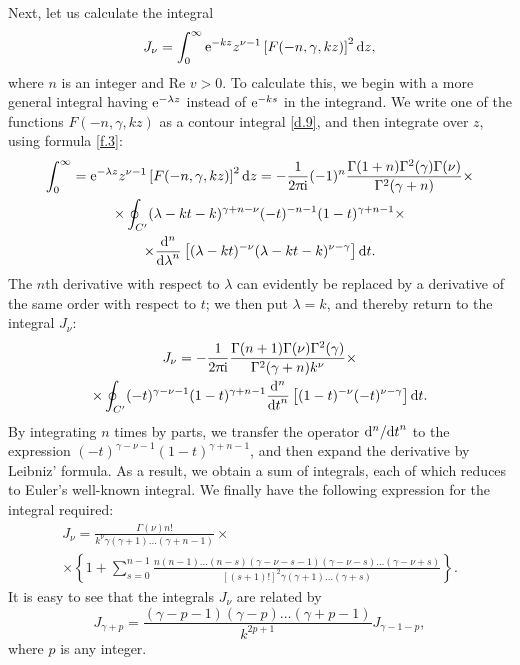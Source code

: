 Next, let us calculate the integral
\begin{equation}\label{f.6}
J_\nu=\int_{0}^{\infty}\mathrm{e}^{-kz}z^{\nu-1}\left[F(-n,\gamma,kz) \right]^2\mathrm{d} z,
\end{equation}
where $ n $ is an integer and $ \text{Re } v > 0 $. To calculate this, we begin with a more general integral having $ \mathrm{e}^{-\lambda z} $ instead of $ \mathrm{e}^{-ks} $ in the integrand. We write one of the functions $ F (-n, \gamma, kz) $ as a contour integral \eqref{d.9}, and then integrate over $ z $, using formula \eqref{f.3}:
\begin{multline*}
\int_{0}^{\infty}=\mathrm{e}^{-\lambda z}z^{\nu-1}\left[F(-n,\gamma,kz) \right]^2\mathrm{d} z=-\frac{1}{2\uppi\mathrm{i}}(-1)^n\frac{\Gamma(1+n)\Gamma^2(\gamma)\Gamma(\nu)}{\Gamma^2(\gamma+n)}\times\\
\times\oint_{C'}(\lambda-kt-k)^{\gamma+n-\nu}(-t)^{-n-1}(1-t)^{\gamma+n-1}\times\\
\times\frac{\mathrm{d}^n}{{\mathrm{d}\lambda}^n}\left[(\lambda-kt)^{-\nu}(\lambda-kt-k)^{\nu-\gamma} \right]\mathrm{d} t.
\end{multline*}
The $ n $th derivative with respect to $\lambda$ can evidently be replaced by a derivative of the same order with respect to $ t $; we then put $ \lambda = k $, and thereby return to the integral $ J_\nu $:
\begin{multline*}
J_\nu=-\frac{1}{2\uppi\mathrm{i}}\frac{\Gamma(n+1)\Gamma(\nu)\Gamma^2(\gamma)}{\Gamma^2(\gamma+n)k^\nu}\times\\
\times\oint_{C'}(-t)^{\gamma-\nu-1}(1-t)^{\gamma+n-1}\frac{\mathrm{d}^n}{{\mathrm{d} t}^n}\left[(1-t)^{-\nu}(-t)^{\nu-\gamma} \right]\mathrm{d} t.
\end{multline*}
By integrating $ n $ times by parts, we transfer the operator $ \mathrm{d}^n/{\mathrm{d} t}^n $ to the expression $ (-t)^{\gamma-\nu-1} (1 - t)^{\gamma+n-1} $, and then expand the derivative by Leibniz’ formula. As a result, we obtain a sum of integrals, each of which reduces to Euler’s well-known integral. We finally have the following expression for the integral required:
\begin{multline}\label{f.7}
J_\nu=\frac{\Gamma(\nu)n!}{k^\nu\gamma(\gamma+1)\dots(\gamma+n-1)}\times\\
\times\left\{1+\sum_{s=0}^{n-1}\frac{n(n-1)\dots(n-s)(\gamma-\nu-s-1)(\gamma-\nu-s)\dots(\gamma-\nu+s)}{[(s+1)!]^2\gamma(\gamma+1)\dots(\gamma+s)}
 \right\}.
\end{multline}
It is easy to see that the integrals $ J_\nu $ are related by
\begin{equation}\label{f.8}
J_{\gamma+p}=\frac{(\gamma-p-1)(\gamma-p)\dots(\gamma+p-1)}{k^{2p+1}}J_{\gamma-1-p},
\end{equation}
where $ p $ is any integer.

